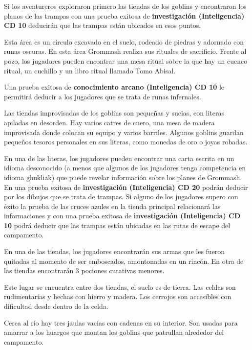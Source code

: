\documentclass[10pt,twoside,twocolumn,openany]{dndbook}
\begin{document}
Si los aventureros exploraron primero las tiendas de los goblins y encontraron los planos de las 
trampas con una prueba exitosa de \textbf{investigación (Inteligencia) CD 10} deducirán que las 
trampas están ubicados en esos puntos.

Esta área es un círculo excavado en el suelo, rodeado de piedras y adornado con runas oscuras. En 
esta área Grommash realiza sus rituales de sacrificio. Frente al pozo, los jugadores pueden 
encontrar una mesa ritual sobre la que hay un cuenco ritual, un cuchillo y un libro ritual
llamado Tomo Abisal.

Una prueba exitosa de \textbf{conocimiento arcano (Inteligencia) CD 10} le permitirá deducir a 
los jugadores que se trata de runas infernales.

Las tiendas improvisadas de los goblins son pequeñas y sucias, con literas apiladas en desorden. 
Hay varios catres de cuero, una mesa de madera improvisada donde colocan su equipo y varios 
barriles. Algunos goblins guardan pequeños tesoros personales en sus literas, como monedas de oro 
o joyas robadas.

En una de las literas, los jugadores pueden encontrar una carta escrita en un idioma desconocido 
(a menos que algunos de los jugadores tenga competencia en idioma ghukliak) que 
puede revelar información sobre los planes de Grommash. En una prueba exitosa de 
\textbf{investigación (Inteligencia) CD 20} podrán deducir por los dibujos que se trata de 
trampas. Si alguno de los jugadores supero con éxito la prueba de las cruces azules en la tienda 
principal relacionará las informaciones y con una prueba exitosa de 
\textbf{investigación (Inteligencia) CD 10} podrá deducir que las trampas están ubicadas en las
rutas de escape del campamento.

En una de las tiendas, los jugadores encontrarán sus armas que les fueron quitadas al momento de 
ser emboscados, amontonadas en un rincón. En otra de las tiendas encontrarán 3 pociones curativas 
menores.

Este lugar se encuentra entre dos tiendas, el suelo es de tierra. Las celdas son rudimentarias
y hechas con hierro y madera. Los cerrojos son accesibles con dificultad desde dentro de la celda.

Cerca al río hay tres jaulas vacías con cadenas en su interior. Son usadas para amarrar a los 
huargos que montan los goblins que patrullan alrededor del campamento.
\end{document}
